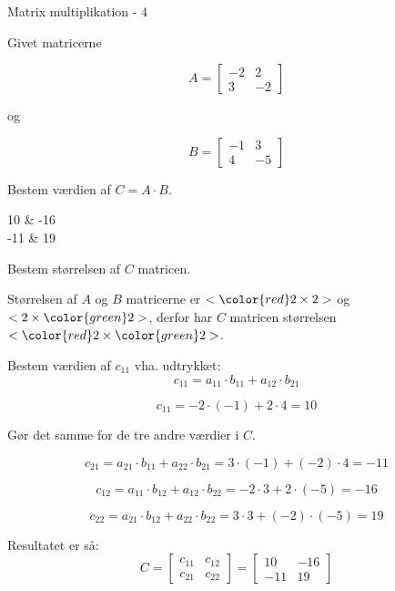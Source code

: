 \documentclass{article}
\begin{document}
\newpage

\begin{exercise}{Matrix multiplikation - 4}

Givet matricerne

\[
A = \left[\begin{array}{rr}
-2 & 2 \\
3 & -2
\end{array} \right]
\]

og

\[
B = \left[\begin{array}{rr}
-1 & 3 \\
4 & -5
\end{array} \right]
\]

Bestem værdien af $C = A \cdot B$.

\begin{answermatrix}
10 & -16 \\
-11 & 19
\end{answermatrix}

\hint
Bestem størrelsen af $C$ matricen.

\hint
Størrelsen af $A$ og $B$ matricerne er $<{\color{red} 2} \times 2>$ og $<2 \times {\color{green}2}>$,
derfor har $C$ matricen størrelsen $<{\color{red} 2} \times {\color{green}2}>$.

\hint
Bestem værdien af $c_{11}$ vha. udtrykket:
\[
c_{11} = a_{11} \cdot b_{11} + a_{12} \cdot b_{21}
\]

\hint
\[
c_{11} = -2 \cdot (-1) + 2 \cdot 4 = 10
\]

\hint
Gør det samme for de tre andre værdier i $C$.

\hint
\[
c_{21} = a_{21} \cdot b_{11} + a_{22} \cdot b_{21} = 3 \cdot (-1) + (-2) \cdot 4 = -11
\]

\hint
\[
c_{12} = a_{11} \cdot b_{12} + a_{12} \cdot b_{22} = -2 \cdot 3 + 2 \cdot (-5) = -16
\]

\hint
\[
c_{22} = a_{21} \cdot b_{12} + a_{22} \cdot b_{22} = 3 \cdot 3 + (-2) \cdot (-5) = 19
\]


\hint
Resultatet er så:
\[
C = \left[\begin{array}{rr}
c_{11} & c_{12} \\
c_{21} & c_{22}
\end{array} \right] =
\left[\begin{array}{rr}
10 & -16 \\
-11 & 19
\end{array} \right]
\]


\end{exercise}
\end{document}
